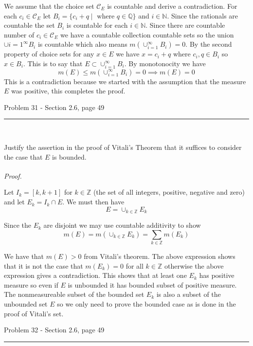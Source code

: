 \documentclass[11pt,reqno]{article}
\begin{document}
We assume that the choice set $\mathcal{C}_E$ is countable and derive a contradiction. For each $c_i \in \mathcal{C}_E$ let $B_i = \{ c_i + q \; | \;\text{ where } q \in \mathbb{Q} \}$ and $i \in \mathbb{N}$. Since the rationals are countable the set $B_i$ is countable for each $i \in \mathbb{N}$. Since there are countable number of $c_i \in \mathcal{C}_E$ we have a countable collection countable sets so the union $\cup{i = 1}^\infty B_i$ is countable which also means $m(\cup_{i = 1}^\infty B_i) = 0$. By the second property of choice sets for any $x \in E$ we have $x = c_i + q$ where $c_i, q \in B_i$ so $x \in B_i$. This is to say that $E \subset \cup_{i = 1}^\infty B_i$. By monotonocity we have
\[ m(E) \le m(\cup_{i =1}^\infty B_i) = 0 \implies m(E) = 0 \]
This is a contradiction because we started with the assumption that the measure $E$ was positive, this completes the proof.

\begin{flushleft} 
Problem 31 - Section 2.6, page 49\\
\rule{500pt}{1pt}\\
\end{flushleft} 

Justify the assertion in the proof of Vitali's Theorem that it suffices to consider the case that $E$ is bounded.
\\\\ \emph{Proof.}

Let $I_k = [k, k + 1]$ for $k \in \mathbb{Z}$ (the set of all integers, positive, negative and zero) and let $E_k = I_k \cap E$. We must then have 
\[ E = \cup_{k \in \mathbb{Z}} E_k \]

\noindent Since the $E_k$ are disjoint we may use countable additivity to show
\[ m(E) = m(\cup_{k \in \mathbb{Z}} E_k) = \sum_{k \in \mathbb{Z}} m(E_k)\]

We have that $m(E) > 0$ from Vitali's theorem. The above expression shows that it is not the case that $m(E_k) = 0$ for all $k \in \mathbb{Z}$ otherwise the above expression gives a contradiction. This shows that at least one $E_k$ has positive measure so even if $E$ is unbounded it has bounded subset of positive measure. The nonmeasureable subset of the bounded set $E_k$ is also a subset of the unbounded set $E$ so we only need to prove the bounded case as is done in the proof of Vitali's set.


\begin{flushleft} 
Problem 32 - Section 2.6, page 49\\
\rule{500pt}{1pt}\\
\end{flushleft} 
\end{document}
